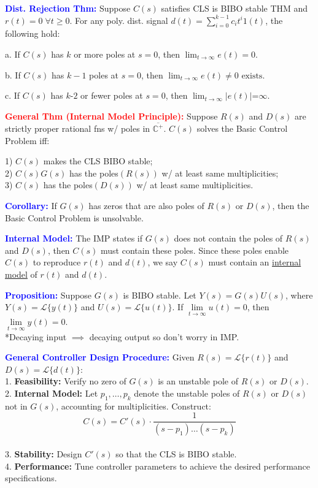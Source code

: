 \documentclass[5pt]{extarticle} %
\begin{document}
\begin{paracol}{3}
{    \textcolor{blue}{\textbf{Dist. Rejection Thm:}} Suppose $C(s)$ satisfies CLS is BIBO stable THM and $r(t) = 0 \; \forall t \geq 0$. For any poly. dist. signal $d(t) = \sum_{i=0}^{k-1} c_i t^i 1(t)$, the following hold:

        a. If $C(s)$ has $k$ or more poles at $s = 0$, then $\lim_{t \to \infty} e(t) = 0.$

        b. If $C(s)$ has $k-1$ poles at $s = 0$, then $\lim_{t \to \infty} e(t) \neq 0 \text{ exists}.$ 

        c. If $C(s)$ has $k\text{-}2$ or fewer poles at $s = 0$, then $\lim_{t \to \infty} |e(t)| \text{=} \infty.$

    \textcolor{red}{\textbf{General Thm (Internal Model Principle):}} Suppose $R(s)$ and $D(s)$ are strictly proper rational fns w/ poles in $\overline{\mathbb{C}^{+}}$. $C(s)$ solves the Basic Control Problem iff:

    1) $C(s)$ makes the CLS BIBO stable; \\
    2) $C(s) G(s)$ has the poles$(R(s))$ w/ at least same multiplicities; \\
    3) $C(s)$ has the poles$(D(s))$ w/ at least same multiplicities.

    \textcolor{blue}{\textbf{Corollary:}} If $G(s)$ has zeros that are also poles of $R(s)$ or $D(s)$, then the Basic Control Problem is unsolvable.

    \textcolor{blue}{\textbf{Internal Model:}} The IMP states if $G(s)$ does not contain the poles of $R(s)$ and $D(s)$, then $C(s)$ must contain these poles. Since these poles enable $C(s)$ to reproduce $r(t)$ and $d(t)$, we say $C(s)$ must contain an \underline{internal model} of $r(t)$ and $d(t)$.

    \textcolor{blue}{\textbf{Proposition:}} Suppose $G(s)$ is BIBO stable. Let $Y(s) = G(s) U(s)$, where $Y(s) = \mathcal{L}\{ y(t) \}$ and $U(s) = \mathcal{L}\{ u(t) \}$. If $\lim\limits_{t \to \infty} u(t) = 0$, then $\lim\limits_{t \to \infty} y(t) = 0$. \\
    *Decaying input $\implies$ decaying output so don't worry in IMP.

    \textcolor{blue}{\textbf{General Controller Design Procedure:}} Given $R(s) = \mathcal{L}\{ r(t) \}$ and $D(s) = \mathcal{L}\{ d(t) \}$: \\
    1. \textbf{Feasibility:} Verify no zero of $G(s)$ is an unstable pole of $R(s)$ or $D(s)$. \\
    2. \textbf{Internal Model:} Let $p_1, \dots, p_k$ denote the unstable poles of $R(s)$ or $D(s)$ not in $G(s)$, accounting for multiplicities. Construct:
    \[ C(s) = C'(s) \cdot \frac{1}{(s - p_1) \dots (s - p_k)} \] \\
    3. \textbf{Stability:} Design $C'(s)$ so that the CLS is BIBO stable. \\
    4. \textbf{Performance:} Tune controller parameters to achieve the desired performance specifications.

}
\end{paracol}
\end{document}
